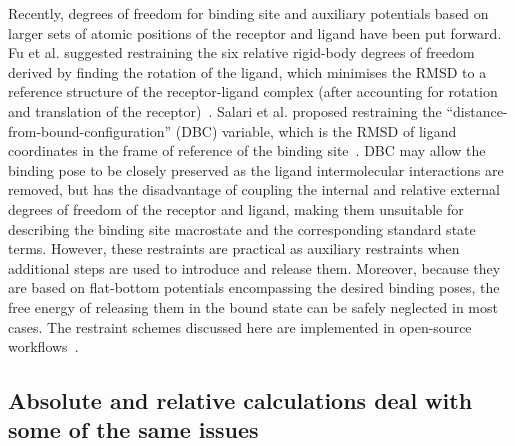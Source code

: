 \documentclass[9pt,bestpractices]{livecoms}
\begin{document}
Recently, degrees of freedom for binding site and auxiliary potentials based on larger sets of atomic positions of the receptor and ligand have been put forward.
Fu et al. suggested restraining the six relative rigid-body degrees of freedom derived by finding the rotation of the ligand, which minimises the RMSD to a reference structure of the receptor-ligand complex (after accounting for rotation and translation of the receptor)~\cite{fu2017new}. Salari et al. proposed restraining the ``distance-from-bound-configuration'' (DBC) variable, which is the RMSD of ligand coordinates in the frame of reference of the binding site~\cite{salari2018streamlined, ebrahimi2022symmetry}. DBC may allow the binding pose to be closely preserved as the ligand intermolecular interactions are removed, but has the disadvantage of coupling the internal and relative external degrees of freedom of the receptor and ligand, making them unsuitable for describing the binding site macrostate and the corresponding standard state terms. However, these restraints are practical as auxiliary restraints when additional steps are used to introduce and release them. Moreover, because they are based on flat-bottom potentials encompassing the desired binding poses, the free energy of releasing them in the bound state can be safely neglected in most cases. The restraint schemes discussed here are implemented in open-source workflows~\cite{fu2021bfee2, fu2022accurate, santiago-mcrae2023computing, clark2023comparison, hedges2023suite}.

\subsection{Absolute and relative calculations deal with some of the same issues} 
\end{document}
